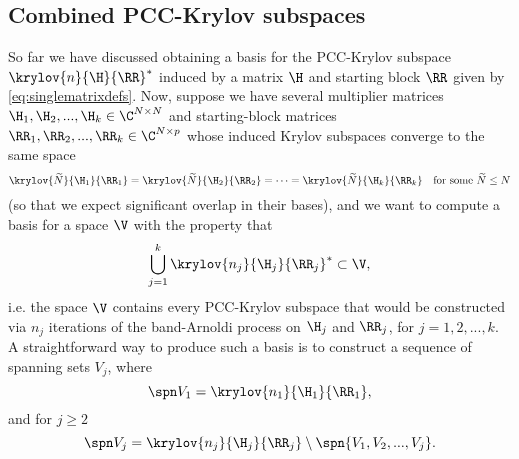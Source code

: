 \begin{comment}
\begin{enumerate}
\item Can we construct a basis for \eqref{eq:splitK} directly, as suggested in Sec.~\ref{sec:direct}?
\item Are there any other (better) ways to construct a real basis for \eqref{eq:splitK}?
\end{enumerate}




\subsection{Scaling matrices for better numerical precision}
As noted in \cite[remark 13]{posreal}, if matrices $A$ and $E$ have norms of significantly
different orders of magnitude, numerical accuracy of computing eigenvalues of the pencil
$A-\mu E$ can be improved by scaling one of the matrices.  The re-scaled pencil is
$ A-(\mu /\tau) (\tau E) $, where $\tau$ is chosen so that the norms of $A$ and $\tau E$ are
of the same order.

\subsection{some results of numerical experiments}

\end{comment}  %

\subsection{Combined PCC-Krylov subspaces}
So far we have discussed obtaining a basis for  the PCC-Krylov subspace $\krylov{n}{\H}{\RR}^*$
induced by a matrix $\H$ and starting block $\RR$ given by \eqref{eq:singlematrixdefs}.
Now, suppose we have several multiplier matrices
$\H_1, \H_2,...,\H_k\in\C^{N\times N}$
and starting-block matrices $\RR_1,\RR_2,...,\RR_k\in\C^{N\times p}$
whose induced Krylov subspaces converge to the same space
\[
\krylov{\widetilde{N}}{\H_1}{\RR_1} = \krylov{\widetilde{N}}{\H_2}{\RR_2}
= \cdots = \krylov{\widetilde{N}}{\H_k}{\RR_k}
\quad \text{for some }\widetilde{N}\leq N
\]
(so that we expect significant overlap in their bases), and
we want to compute a basis  for a space
$\V$ with the property that
\[
	\bigcup_{j=1}^{k}\krylov{n_j}{\H_j}{\RR_j}^* \subset \V,
\]
i.e. the space $\V$ contains every PCC-Krylov subspace that would be constructed via
$n_j$ iterations of the band-Arnoldi process on $\H_j$ and $\RR_j$, for $j=1,2,...,k$.
A straightforward way to produce such a basis is to construct a sequence of
spanning sets $V_j$, where
\[
\spn V_1 = \krylov{n_1}{\H_1}{\RR_1},
\]
and for $j\geq 2$
\[
\spn V_j = \krylov{n_j}{\H_j}{\RR_j} \setminus \spn\{V_1,V_2,...,V_j\}.
\]


